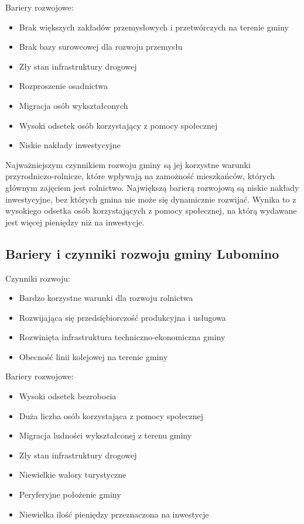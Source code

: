 \documentclass[a4paper,10pt]{article}
\begin{document}
    Bariery rozwojowe:
    \begin{itemize}
     \item Brak większych zakładów przemysłowych i przetwórczych na terenie gminy
     \item Brak bazy surowcowej dla rozwoju przemysłu
     \item Zły stan infrastruktury drogowej
     \item Rozproszenie osadnictwa
     \item Migracja osób wykształconych
     \item Wysoki odsetek osób korzystający z pomocy społecznej
     \item Niskie nakłady inwestycyjne
    \end{itemize}
    
    Najważniejszym czynnikiem rozwoju gminy są jej korzystne warunki przyrodniczo-rolnicze, które wpływają na zamożność mieszkańców, 
    których głównym zajęciem jest rolnictwo.
    Największą barierą rozwojową są niskie nakłady inwestycyjne, bez których gmina nie może się dynamicznie rozwijać. 
    Wynika to z wysokiego odsetka osób korzystających z pomocy społecznej, na którą wydawane jest więcej pieniędzy niż na inwestycje.
   
  \subsection{Bariery i czynniki rozwoju gminy Lubomino}
    Czynniki rozwoju:
    
    \begin{itemize}
     \item Bardzo korzystne warunki dla rozwoju rolnictwa
     \item Rozwijająca się przedsiębiorczość produkcyjna i usługowa
     \item Rozwinięta infrastruktura techniczno-ekonomiczna gminy
     \item Obecność linii kolejowej na terenie gminy
    \end{itemize}
    
    Bariery rozwojowe:
    \begin{itemize}
     \item Wysoki odsetek bezrobocia
     \item Duża liczba osób korzystająca z pomocy społecznej
     \item Migracja ludności wykształconej z terenu gminy
     \item Zły stan infrastruktury drogowej
     \item Niewielkie walory turystyczne
     \item Peryferyjne położenie gminy
     \item Niewielka ilość pieniędzy przeznaczona na inwestycje
    \end{itemize}
    
\end{document}

